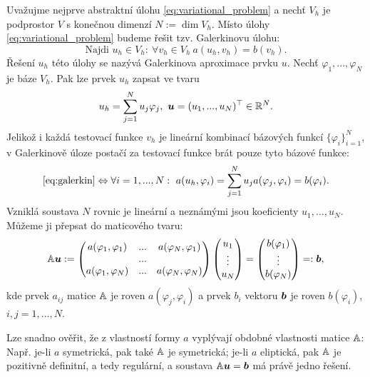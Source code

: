 Uvažujme nejprve abstraktní úlohu \eqref{eq:variational_problem} a nechť $V_h$ je podprostor $V$ s konečnou dimenzí $N:=\dim V_h$.
Místo úlohy \eqref{eq:variational_problem} budeme řešit tzv. Galerkinovu úlohu:
\begin{equation}\label{eq:galerkin}
\mbox{Najdi }u_h\in V_h:~\forall v_h\in V_h~a(u_h,v_h)=b(v_h).
\end{equation}
Řešení $u_h$ této úlohy se nazývá Galerkinova aproximace prvku $u$.
Nechť $\varphi_1,...,\varphi_N$ je báze $V_h$.
Pak lze prvek $u_h$ zapsat ve tvaru
\[ u_h=\sum_{j=1}^N u_j\varphi_j,~\mathbf{\boldsymbol{u}}=(u_1,...,u_N)^\top\in\mathbb R^N. \]
Jelikož i každá testovací funkce $v_h$ je lineární kombinací bázových funkcí $\{\varphi_i\}_{i=1}^N$, v Galerkinově úloze postačí za testovací funkce brát pouze tyto bázové funkce:
\[ \eqref{eq:galerkin} \Leftrightarrow \forall i=1,...,N:~ a(u_h,\varphi_i)=\sum_{j=1}^N u_j a(\varphi_j,\varphi_i) = b(\varphi_i). \]
Vzniklá soustava $N$ rovnic je lineární a neznámými jsou koeficienty $u_1,...,u_N$.
Můžeme ji přepsat do maticového tvaru:
\[ {\mathbb{A}}\mathbf{\boldsymbol{u}} := \begin{pmatrix}a(\varphi_1,\varphi_1) & ... & a(\varphi_N,\varphi_1)\\&...&\\a(\varphi_1,\varphi_N) & ... & a(\varphi_N,\varphi_N)\end{pmatrix}\begin{pmatrix}u_1\\\vdots\\ u_N\end{pmatrix} = \begin{pmatrix}b(\varphi_1)\\\vdots\\b(\varphi_N)\end{pmatrix} =: \mathbf{\boldsymbol{b}}, \]
kde prvek $a_{ij}$ matice ${\mathbb{A}}$ je roven $a(\varphi_j,\varphi_i)$ a prvek $b_i$ vektoru $\mathbf{\boldsymbol{b}}$ je roven $b(\varphi_i)$, $i,j=1,...,N$.

Lze snadno ověřit, že z vlastností formy $a$ vyplývají obdobné vlastnosti matice ${\mathbb{A}}$: Např. je-li $a$ symetrická, pak také ${\mathbb{A}}$ je symetrická; je-li $a$ eliptická, pak ${\mathbb{A}}$ je pozitivně definitní, a tedy regulární, a soustava ${\mathbb{A}}\mathbf{\boldsymbol{u}}=\mathbf{\boldsymbol{b}}$ má právě jedno řešení.


